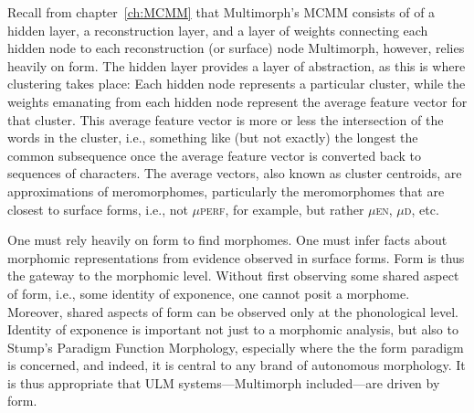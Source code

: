 Recall from chapter~\ref{ch:MCMM} that Multimorph's \ac{MCMM} consists of
of a hidden layer, a reconstruction layer, and a layer of
weights connecting each hidden node to each reconstruction (or surface) node
Multimorph, however, relies heavily on form. The hidden 
layer provides a layer of abstraction, as this is where 
clustering takes place: Each hidden node represents 
a particular cluster, while the weights emanating from
each hidden node represent the average feature vector for that
cluster. This average feature vector is more or less the intersection
of the words in the cluster, i.e., something like (but not exactly) 
the longest the common subsequence once the average feature vector
is converted back to sequences of characters. The average vectors, also known as
cluster centroids, are approximations of meromorphomes, 
particularly the meromorphomes
that are closest to surface forms, i.e., not $\mu${\textsc{perf}}, 
for example, but rather $\mu${\textsc{en}},
$\mu${\textsc{d}}, etc.

One must rely heavily on form to find morphomes. One 
must infer facts about morphomic representations
from evidence observed in surface forms. Form is thus the 
gateway to the morphomic level. Without first observing 
some shared aspect of form, i.e., some identity of exponence, 
one cannot posit a morphome. Moreover, shared aspects of form 
can be observed only at the phonological level.
Identity of exponence is important not just to a morphomic analysis,
but also to Stump's Paradigm Function Morphology, especially where the 
the form paradigm is concerned, and indeed, it is central to any 
brand of autonomous morphology. It is thus appropriate that \ac{ULM} 
systems---Multimorph included---are driven by form.

